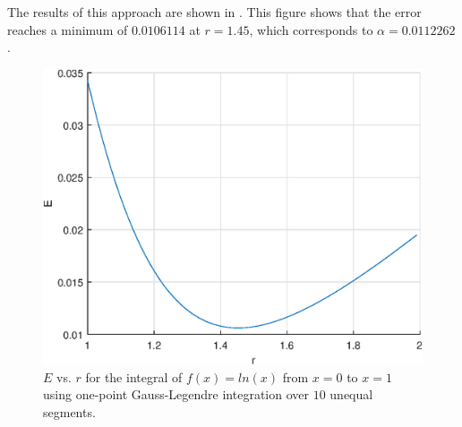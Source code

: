 \documentclass[journal,hidelinks]{IEEEtran}
\begin{document}
The results of this approach are shown in . This figure shows that the error reaches a minimum of $0.0106114$ at $r = 1.45$, which corresponds to $\alpha = 0.0112262$.

\begin{figure}[!htb]
  \centering
  \includegraphics[width=\columnwidth]{question-4/q4c.eps}
  \caption{$E$ vs. $r$ for the integral of $f(x) = ln(x)$ from $x = 0$ to $x = 1$ using one-point Gauss-Legendre integration over $10$ unequal segments.}
  \label{fig:q4c}
\end{figure}

\newpage
\onecolumn
\end{document}
